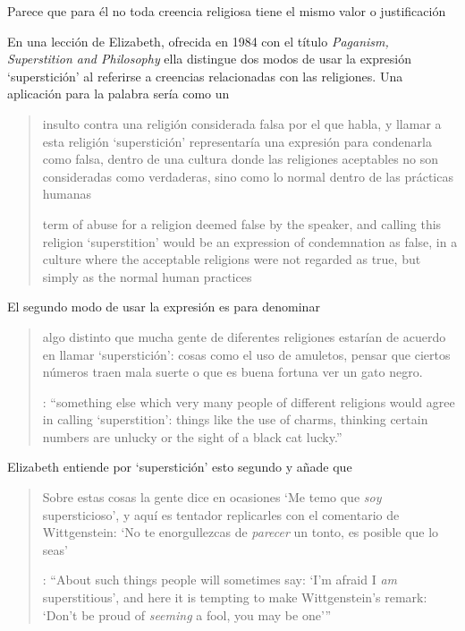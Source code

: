 Parece que para él no toda creencia religiosa tiene el mismo valor o justificación

En una lección de Elizabeth, ofrecida en 1984 con el título \emph{Paganism, Superstition and Philosophy} ella distingue dos modos de usar la expresión `superstición' al referirse a creencias relacionadas con las religiones. Una aplicación para la palabra sería como un \blockquote[term of abuse for a religion deemed false by the speaker, and calling this religion `superstition' would be an expression of condemnation as false, in a culture where the acceptable religions were not regarded as true, but simply as the normal human practices]{insulto contra una religión considerada falsa por el que habla, y llamar a esta religión `superstición' representaría una expresión para condenarla como falsa, dentro de una cultura donde las religiones aceptables no son consideradas como verdaderas, sino como lo normal dentro de las prácticas humanas}. El segundo modo de usar la expresión es para denominar \blockquote[{\cite[57]{anscombe2008faith:paganism}}: \enquote{something else which very many people of different religions would agree in calling `superstition': things like the use of charms, \texelp{} thinking certain numbers are unlucky or the sight of a black cat lucky.}]{algo distinto que mucha gente de diferentes religiones estarían de acuerdo en llamar `superstición': cosas como el uso de amuletos, \textelp{} pensar que ciertos números traen mala suerte o que es buena fortuna ver un gato negro.} Elizabeth entiende por `superstición' esto segundo y añade que \blockquote[{\cite[57]{anscombe2008faith:paganism}}: \enquote{About such things people will sometimes say: `I'm afraid I \emph{am} superstitious', and here it is tempting to make Wittgenstein's remark: `Don't be proud of \emph{seeming} a fool, you may be one'}]{Sobre estas cosas la gente dice en ocasiones `Me temo que \emph{soy} supersticioso', y aquí es tentador replicarles con el comentario de Wittgenstein: `No te enorgullezcas de \emph{parecer} un tonto, es posible que lo seas'}.

